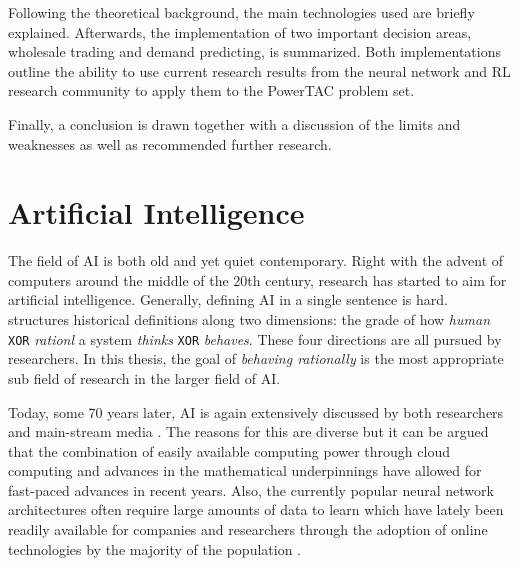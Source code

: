 Following the theoretical background, the main technologies used are briefly explained. Afterwards, the implementation
of two important decision areas, wholesale trading and demand predicting, is summarized. Both implementations outline
the ability to use current research results from the neural network and \ac{RL} research community to apply them to the
\ac{PowerTAC} problem set.

Finally, a conclusion is drawn together with a discussion of the limits and weaknesses as well as recommended further research.



\section{Artificial Intelligence}%
\label{sec:artificial_intelligence}


The field of \ac{AI} is both old and yet quiet contemporary.
Right with the advent of computers around the middle of the 20th century, research has started to aim for artificial
intelligence. Generally, defining \ac{AI} in a single sentence is hard. \citet{russell2016artificial} structures
historical definitions along two dimensions: the grade of how \emph{human} \texttt{XOR} \emph{rationl} a system
\emph{thinks} \texttt{XOR} \emph{behaves}. These four directions are all pursued by researchers. In
this thesis, the goal of \emph{behaving rationally} is the most appropriate sub field of research in the larger field of
\ac{AI}.

Today, some 70 years later, \ac{AI} is again extensively discussed by both researchers and main-stream media
\citep[p.24ff.]{russell2016artificial, arulkumaran2017brief}. The reasons for this are diverse but it can be argued that
the combination of easily available computing power through cloud computing and advances in the mathematical
underpinnings have allowed for fast-paced advances in recent years. Also, the currently popular neural network
architectures often require large amounts of data to learn which have lately been readily available for companies and
researchers through the adoption of online technologies by the majority of the population
\citep[p.27]{russell2016artificial}.

